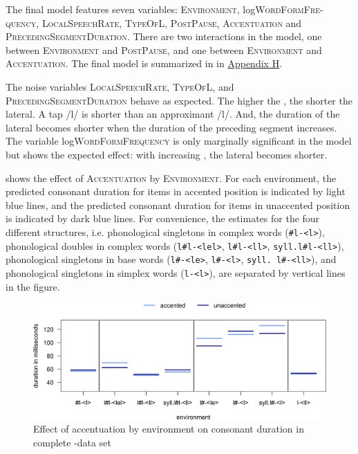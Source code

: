 The final model features seven variables: \textsc{Environment}, log\textsc{WordFormFre-quency},  \textsc{LocalSpeechRate}, \textsc{TypeOfL}, \textsc{PostPause}, \textsc{Accentuation} and \textsc{PrecedingSegmentDuration}. 
There are two interactions in the model, one between \textsc{Environment} and \textsc{PostPause}, and one between \textsc{Environment} and \textsc{Accentuation}. The final model is summarized in  in \hyperref[Appendix H: Model Summaries Experiment]{Appendix H}.


The noise variables \textsc{LocalSpeechRate}, \textsc{TypeOfL}, and \textsc{PrecedingSegmentDuration} behave as expected. The higher the , the shorter the lateral. A tap /l/ is shorter than an approximant /l/. And, the duration of the lateral becomes shorter when the duration of the preceding segment increases.
The variable log\textsc{WordFormFrequency} is only marginally significant in the model but shows the expected effect: with increasing , the lateral becomes shorter. 


 shows the effect of \textsc{Accentuation} by \textsc{Environment}. For each environment, the predicted consonant duration for items in accented position is indicated by light blue lines, and the predicted consonant duration for  items in unaccented position is indicated by dark blue lines.
 For convenience, the estimates for the four different structures, i.e. phonological singletons in complex words (\texttt{\#l-<l>}), phonological doubles in complex words  (\texttt{l\#l-<lel>}, \texttt{l\#l-<ll>}, \texttt{syll.l\#l-<ll>}), phonological singletons in base words (\texttt{l\#-<le>}, \texttt{l\#-<l>}, \texttt{syll. l\#-<ll>}), and phonological singletons in simplex words (\texttt{l-<l>}), are separated by vertical lines in the figure.


\begin{figure}
	

	\includegraphics [scale=0.48] {images/Experiment/LyModelCompleteInterEnvAccLines}

	\caption{Effect of accentuation by environment on consonant duration in complete -data set}
	\label{fig:Env Acc ly Complete experiment}

\end{figure}





